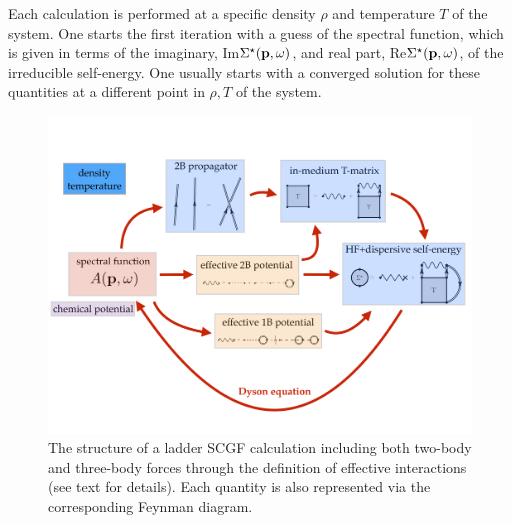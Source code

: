Each calculation is performed at a specific density $\rho$ and temperature $T$ of the system. One starts the first iteration with a guess of the spectral function, which is given in terms of the imaginary, Im$\Sigma^\star({\bf p},\omega)$, and real part, Re$\Sigma^\star({\bf p},\omega)$, of the irreducible self-energy. One usually starts with a converged solution for these quantities at a different point in $\rho, T$ of the system.

 
\begin{figure}[t]
\begin{center}
\includegraphics[width=1.0\textwidth]{Chapter11-figures/numerical_scgf_diagrams.pdf}
\caption{The structure of a ladder SCGF calculation including both two-body and three-body forces through the definition of effective interactions (see text for details). Each quantity is also represented via the corresponding Feynman diagram.}
\label{fig:num_impl}
\end{center}
\end{figure}

